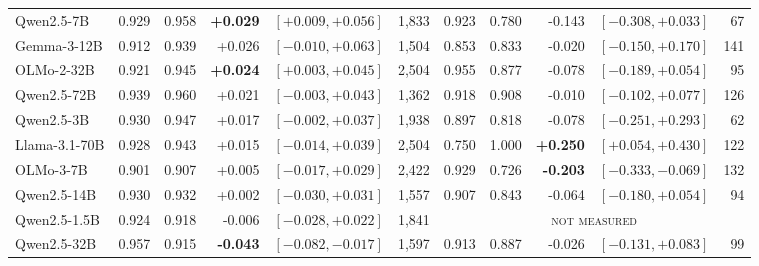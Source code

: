 \begin{table}[tb]
\begin{tabular}{lrrrlr@{\hspace{8pt}}rrrlr}
Qwen2.5-7B & 0.929 & 0.958 & \textbf{+0.029} & $[+0.009,+0.056]$ & 1,833 & 0.923 & 0.780 & -0.143 & $[-0.308,+0.033]$ & 67 \\
Gemma-3-12B & 0.912 & 0.939 & +0.026 & $[-0.010,+0.063]$ & 1,504 & 0.853 & 0.833 & -0.020 & $[-0.150,+0.170]$ & 141 \\
OLMo-2-32B & 0.921 & 0.945 & \textbf{+0.024} & $[+0.003,+0.045]$ & 2,504 & 0.955 & 0.877 & -0.078 & $[-0.189,+0.054]$ & 95 \\
Qwen2.5-72B & 0.939 & 0.960 & +0.021 & $[-0.003,+0.043]$ & 1,362 & 0.918 & 0.908 & -0.010 & $[-0.102,+0.077]$ & 126 \\
Qwen2.5-3B & 0.930 & 0.947 & +0.017 & $[-0.002,+0.037]$ & 1,938 & 0.897 & 0.818 & -0.078 & $[-0.251,+0.293]$ & 62 \\
Llama-3.1-70B & 0.928 & 0.943 & +0.015 & $[-0.014,+0.039]$ & 2,504 & 0.750 & 1.000 & \textbf{+0.250} & $[+0.054,+0.430]$ & 122 \\
OLMo-3-7B & 0.901 & 0.907 & +0.005 & $[-0.017,+0.029]$ & 2,422 & 0.929 & 0.726 & \textbf{-0.203} & $[-0.333,-0.069]$ & 132 \\
Qwen2.5-14B & 0.930 & 0.932 & +0.002 & $[-0.030,+0.031]$ & 1,557 & 0.907 & 0.843 & -0.064 & $[-0.180,+0.054]$ & 94 \\
Qwen2.5-1.5B & 0.924 & 0.918 & -0.006 & $[-0.028,+0.022]$ & 1,841 & \multicolumn{5}{c}{\textsc{not measured}} \\
Qwen2.5-32B & 0.957 & 0.915 & \textbf{-0.043} & $[-0.082,-0.017]$ & 1,597 & 0.913 & 0.887 & -0.026 & $[-0.131,+0.083]$ & 99 \\
\bottomrule
\end{tabular}
\end{table}
